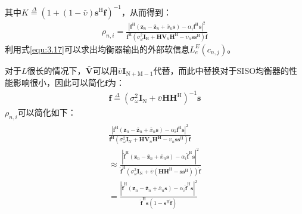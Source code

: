 其中$K\overset{\Delta}{=}(1+(1-\bar{\upsilon})\mathbf{s}^{\mathrm{H}}\mathbf{f})^{-1}$，从而得到：
\begin{eqnarray}
    \rho_{n,i}=\frac{|\mathbf{f}^{\mathrm{H}}(\mathbf{z}_n-\bar{\mathbf{z}}_n+\bar{x}_n\mathbf{s})-\alpha_i\mathbf{f}^{\mathrm{H}}\mathbf{s}|^2}{\mathbf{f}^{\mathrm{H}}(\sigma_{\omega}^2\mathbf{I}_{\mathrm{H}}+\mathbf{H}\mathbf{V}_n\mathbf{H}^{\mathrm{H}}-\upsilon_n\mathbf{s}\mathbf{s}^{\mathrm{H}})\mathbf{f}}
    \label{equ:3.35}
\end{eqnarray}
利用式\ref{equ:3.17}可以求出均衡器输出的外部软信息$L_e^E(c_{n,j})$。

对于$L$很长的情况下，$\bar{\mathbf{V}}$可以用$\bar{\upsilon}\mathbf{I}_{\mathrm{N+M}-1}$代替，而此中替换对于SISO均衡器的性能影响很小，因此可以简化$\mathbf{f}$为：
\begin{eqnarray}
    \hat{\mathbf{f}}\overset{\Delta}{=}(\sigma_{\omega}^2\mathbf{I}_{\mathrm{N}}+\bar{\upsilon}\mathbf{H}\mathbf{H}^{\mathrm{H}})^{-1}\mathbf{s}
    \label{equ:3.36}
\end{eqnarray}
$\rho_{n,i}$可以简化如下：
\begin{eqnarray}
    \begin{array}{c}
        \frac{\displaystyle
        |\mathbf{f}^{\mathrm{H}}(\mathbf{z}_n-\bar{\mathbf{z}}_n+\bar{x}_n\mathbf{s})-\alpha_i\mathbf{f}^{\mathrm{H}}\mathbf{s}|^2}{\displaystyle \mathbf{f}^{\mathrm{H}}(\sigma_{\omega}^2\mathbf{I}_{\mathrm{N}}+\mathbf{H}\mathbf{V}_n\mathbf{H}^{\mathbf{H}}-\upsilon_n\mathbf{s}\mathbf{s}^{\mathrm{H}})\mathbf{f}}\\
        \approx
        \frac{\displaystyle
        |\hat{\mathbf{f}}^{\mathrm{H}}(\mathbf{z}_n-\bar{\mathbf{z}}_n+\bar{x}_n\mathbf{s})-\alpha_i\hat{\mathbf{f}}^{\mathrm{H}}\mathbf{s}|^2}{\displaystyle \hat{\mathbf{f}}^{\mathrm{H}}(\sigma_{\omega}^2\mathbf{I}_{\mathrm{N}}+\bar{\upsilon}(\mathbf{H}\mathbf{H}^{\mathrm{H}}-\mathbf{s}\mathbf{s}^{\mathrm{H}}))\hat{\mathbf{f}}}\\
        =\frac{\displaystyle
        |\hat{\mathbf{f}}^{\mathrm{H}}(\mathbf{z}_n-\bar{\mathbf{z}}_n+\bar{x}_n\mathbf{s})-\alpha_i\hat{\mathbf{f}}^{\mathrm{H}}\mathbf{s}|^2}{\displaystyle \hat{\mathbf{f}}^{\mathrm{H}}\mathbf{s}(1-\mathbf{s}^{\mathrm{H}}\hat{\mathbf{f}})}
    \end{array}
    \label{equ:3.37}
\end{eqnarray}

